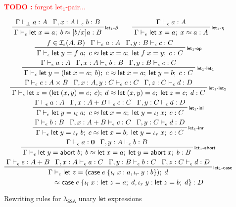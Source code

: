 \documentclass[acmsmall,screen,review]{acmart}
\newcounter{todos}
\newcommand{\TODO}[1]{{
  \stepcounter{todos}
  \begin{center}\large{\textcolor{red}{\textbf{TODO \arabic{todos}:} #1}}\end{center}
}}
\newcommand{\mc}[1]{\ensuremath{\mathcal{#1}}}
\newcommand{\mb}[1]{\ensuremath{\mathbf{#1}}}
\newcommand{\ms}[1]{\ensuremath{\mathsf{#1}}}
\newcommand{\lto}{:}
\newcommand{\linl}[1]{\iota_l\;{#1}}
\newcommand{\linr}[1]{\iota_r\;{#1}}
\newcommand{\labort}[1]{\ms{abort}\;{#1}}
\newcommand{\letexpr}[3]{\ensuremath{\ms{let}\;#1 = #2;\;#3}}
\newcommand{\caseexpr}[5]{\ms{case}\;#1\;\{\linl{#2} \lto #3, \linr{#4} \lto #5\}}
\newcommand{\bhyp}[2]{#1 : #2}
\newcommand{\rle}[1]{{\scriptsize\textsf{#1}}}
\newcommand{\hasty}[4]{#1 \vdash_{#2} #3: {#4}}
\newcommand{\isop}[4]{#1 \in \mc{I}_{#4}(#2, #3)}
\newcommand{\teqv}{\approx}
\newcommand{\tmeq}[5]{#1 \vdash_{#2} #3 \teqv #4 : {#5}}
\newcommand{\brle}[1]{{\textsf{#1}}}
\newcommand{\isotopessa}{\(\lambda_{\ms{SSA}}\)}
\begin{document}
\begin{figure}
  \TODO{forgot \brle{let$_1$-pair}...}
  \begin{gather*}
    \prftree[r]{\rle{let$_1$-$\beta$}}
      {\hasty{\Gamma}{\bot}{a}{A}}
      {\hasty{\Gamma, \bhyp{x}{A}}{\epsilon}{b}{B}}
      {\tmeq{\Gamma}{\epsilon}{\letexpr{x}{a}{b}}{[b/x]a}{B}}
    \qquad
    \prftree[r]{\rle{let$_1$-$\eta$}}
      {\hasty{\Gamma}{\epsilon}{a}{A}}
      {\tmeq{\Gamma}{\epsilon}{\letexpr{x}{a}{x}}{a}{A}} 
    \\
    \prftree[r]{\rle{let$_1$-op}}
      {\isop{f}{A}{B}{\epsilon}}
      {\hasty{\Gamma}{\epsilon}{a}{A}}
      {\hasty{\Gamma, \bhyp{y}{B}}{\epsilon}{c}{C}}
      {\tmeq{\Gamma}{\epsilon}{\letexpr{y}{f\;a}{c}}{\letexpr{x}{a}{\letexpr{f\;x}{y}{c}}}{C}}
    \\
    \prftree[r]{\rle{let$_1$-let$_1$}}
      {\hasty{\Gamma}{\epsilon}{a}{A}}
      {\hasty{\Gamma, \bhyp{x}{A}}{\epsilon}{b}{B}}
      {\hasty{\Gamma, \bhyp{y}{B}}{\epsilon}{c}{C}}
      {\tmeq{\Gamma}{\epsilon}
        {\letexpr{y}{(\letexpr{x}{a}{b})}{c}}
        {\letexpr{x}{a}{\letexpr{y}{b}{c}}}{C}}
    \\
    \prftree[r]{\rle{let$_1$-let$_2$}}
      {\hasty{\Gamma}{\epsilon}{e}{A \times B}}
      {\hasty{\Gamma, \bhyp{x}{A}, \bhyp{y}{C}}{\epsilon}{c}{C}}
      {\hasty{\Gamma, \bhyp{z}{C}}{\epsilon}{d}{D}}
      {\tmeq{\Gamma}{\epsilon}
        {\letexpr{z}{(\letexpr{(x, y)}{e}{c})}{d}}
        {\letexpr{(x, y)}{e}{\letexpr{z}{c}{d}}}{C}}
    \\
    \prftree[r]{\rle{let$_1$-inl}}
      {\hasty{\Gamma}{\epsilon}{a}{A}}
      {\hasty{\Gamma, \bhyp{x}{A + B}}{\epsilon}{c}{C}}
      {\hasty{\Gamma, \bhyp{y}{C}}{\epsilon}{d}{D}}
      {\tmeq{\Gamma}{\epsilon}{\letexpr{y}{\linl{a}}{c}}{\letexpr{x}{a}{\letexpr{y}{\linl{x}}{c}}}{C}}
    \\
    \prftree[r]{\rle{let$_1$-inr}}
      {\hasty{\Gamma}{\epsilon}{b}{B}}
      {\hasty{\Gamma, \bhyp{x}{A + B}}{\epsilon}{c}{C}}
      {\hasty{\Gamma, \bhyp{y}{C}}{\epsilon}{d}{D}}
      {\tmeq{\Gamma}{\epsilon}{\letexpr{y}{\linr{b}}{c}}{\letexpr{x}{b}{\letexpr{y}{\linr{x}}{c}}}{C}}
    \\
    \prftree[r]{\rle{let$_1$-abort}}
      {\hasty{\Gamma}{\epsilon}{a}{\mb{0}}}
      {\hasty{\Gamma, \bhyp{y}{A}}{\epsilon}{b}{B}}
      {\tmeq{\Gamma}{\epsilon}
        {\letexpr{y}{\labort{b}}{b}}
        {\letexpr{x}{a}{\letexpr{y}{\labort{x}}{b}}}{B}}
    \\
    \prftree[r]{\rle{let$_1$-case}}
      {\hasty{\Gamma}{\epsilon}{e}{A + B}}
      {\hasty{\Gamma, \bhyp{x}{A}}{\epsilon}{a}{C}}
      {\hasty{\Gamma, \bhyp{y}{B}}{\epsilon}{b}{C}}
      {\hasty{\Gamma, \bhyp{z}{C}}{\epsilon}{d}{D}}
      { 
        \prfStackPremises
        {\Gamma \vdash_\epsilon \letexpr{z}{(\caseexpr{e}{x}{a}{y}{b})}{d}}
        {\hspace{6em} \teqv \caseexpr{e}{x}{\letexpr{z}{a}{d}}{y}{\letexpr{z}{b}{d}} : D}
      }
  \end{gather*}
  \Description{}
  \caption{Rewriting rules for \isotopessa{} unary \ms{let} expressions}
  \label{fig:ssa-unary-let-expr}
\end{figure}
\end{document}
